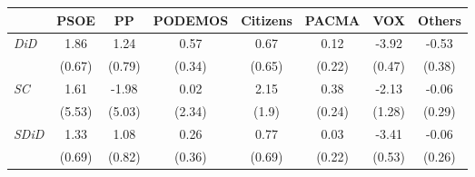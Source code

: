 \begin{table}[ht]
\centering
\begin{tabular}{lccccccc}
\hline
\hline
& PSOE & PP & PODEMOS & Citizens & PACMA & VOX & Others \\
\hline
\textit{DiD} & 1.86 & 1.24 & 0.57 & 0.67 & 0.12 & -3.92 & -0.53 \\
\textit{} & (0.67) & (0.79) & (0.34) & (0.65) & (0.22) & (0.47) & (0.38) \\
\hline
\textit{SC} & 1.61 & -1.98 & 0.02 & 2.15 & 0.38 & -2.13 & -0.06 \\
\textit{} & (5.53) & (5.03) & (2.34) & (1.9) & (0.24) & (1.28) & (0.29) \\
\hline
\textit{SDiD} & 1.33 & 1.08 & 0.26 & 0.77 & 0.03 & -3.41 & -0.06 \\
\textit{} & (0.69) & (0.82) & (0.36) & (0.69) & (0.22) & (0.53) & (0.26) \\
\hline
\hline
\end{tabular}
\end{table}
